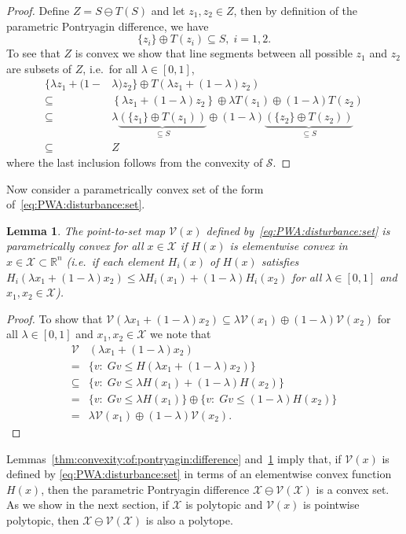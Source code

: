 \documentclass[letterpaper, 10pt, conference]{ieeeconf} %
\newtheorem{thm}{Lemma}[section]
\begin{document}
%
\begin{proof}
Define $ Z =  S\ominus T( S)$ and let $z_1,z_2\in Z$, then
by definition of the parametric Pontryagin difference, we have
%
\[
        \{z_i\} \oplus T(z_i) \subseteq S,\; i=1,2.
\]
%
To see that $ Z$ is convex we show that line segments between
all possible $z_1$ and $z_2$ are subsets of $ Z$, i.e.~for all $\lambda \in [0,1]$,
\[\begin{aligned}
  \{ \lambda z_1 + (1-&\lambda)z_2
  \}\oplus T\left( \lambda z_1 + (1-\lambda)z_2\right)\\
  \subseteq&\left\{ \lambda z_1 + (1-\lambda)z_2
  \right\}\oplus \lambda T(z_1) \oplus (1-\lambda)
  T(z_2)\\
  \subseteq &\lambda\underbrace{(\{z_1\}\oplus T(z_1))}_{\subseteq S}\oplus
  (1-\lambda)\underbrace{(\{z_2\}\oplus T(z_2))}_{\subseteq S}\\
  \subseteq& Z
\end{aligned}\]
%
where the last inclusion follows from the convexity of $\mathcal S$.
\end{proof}
%
%
Now consider a parametrically convex set of the form of~\eqref{eq:PWA:disturbance:set}.
\begin{thm}\label{thm:convex:parametric:set}
  The point-to-set map $\mathcal V (x)$ defined by~\eqref{eq:PWA:disturbance:set} is parametrically 
  convex for all $x\in \mathcal X$ if $H(x)$ is elementwise convex in $x\in \mathcal X\subset 
  \mathbb R^n$ (i.e.~if each element $H_i(x)$ of $H(x)$ satisfies $H_i(\lambda x_1+(1-\lambda)x_2)\leq 
  \lambda H_i(x_1)+(1-\lambda)H_i(x_2)$ for all    $\lambda\in[0,1]$ and $x_1, x_2\in\mathcal X$).
\end{thm}
%
\begin{proof}
To show that $\mathcal V(\lambda x_1 + (1-\lambda)x_2)\subseteq \lambda\mathcal V(x_1) \oplus(1-\lambda)
\mathcal V(x_2)$ for all $\lambda \in [0,1]$ and $x_1, x_2\in\mathcal X$ we note that
%
\begin{align*}
  \mathcal V&(\lambda x_1 + (1-\lambda)x_2)\\
  =& \{v:\; G v \leq H(\lambda x_1 + (1-\lambda)x_2)\}\\
  \subseteq& \{v:\;Gv\leq\lambda H(x_1)+(1-\lambda) H(x_2)\}\\
  =&\{v:\;Gv\leq\lambda H(x_1)\}\oplus\{v
  :\;Gv\leq(1-\lambda)H(x_2)\}\\
  =&\lambda\mathcal V(x_1)\oplus(1-\lambda)\mathcal V(x_2).
  \end{align*}
\baselineskip
\end{proof} 
%
%
\def\genmat{\Xi} \def\genvec{\xi}
Lemmas~\ref{thm:convexity:of:pontryagin:difference} and~\ref{thm:convex:parametric:set} imply that, 
if $\mathcal V(x)$ is defined by \eqref{eq:PWA:disturbance:set} in terms of an elementwise convex 
function $H(x)$, then the parametric Pontryagin difference $\mathcal X\ominus \mathcal V(\mathcal X)$
is a convex set.
As we show in the next section, if $\mathcal X$ is polytopic and $\mathcal 
V(x)$ is pointwise polytopic, then $\mathcal X\ominus\mathcal V(\mathcal X)$ is 
also a polytope. 
%
%
%
%
\end{document}
